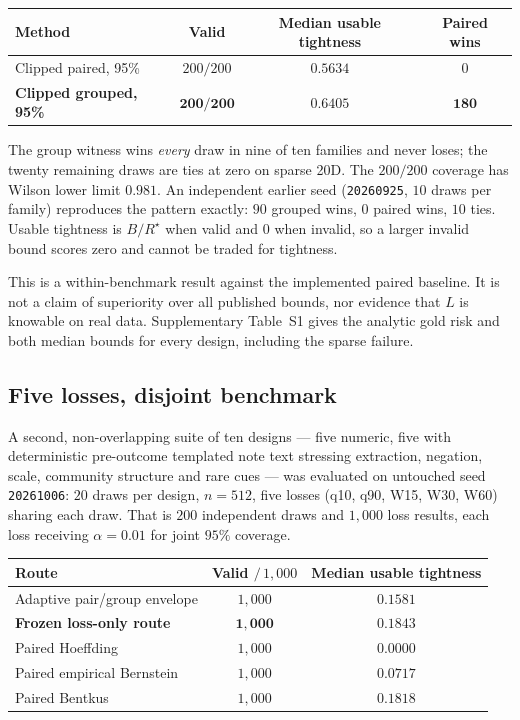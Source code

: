 \documentclass[11pt]{article}
\theoremstyle{definition}
\newcommand{\risk}{R^{\star}}
\begin{document}
\begin{center}
\begin{tabular}{lccc}
\toprule
Method & Valid & Median usable tightness & Paired wins \\
\midrule
Clipped paired, 95\% & $200/200$ & $0.5634$ & $0$ \\
\textbf{Clipped grouped, 95\%} & $\mathbf{200/200}$ & $\mathbf{0.6405}$ & $\mathbf{180}$ \\
\bottomrule
\end{tabular}
\end{center}

The group witness wins \emph{every} draw in nine of ten families and never loses; the twenty remaining draws are ties at zero on sparse 20D. The $200/200$ coverage has Wilson lower limit $0.981$. An independent earlier seed (\texttt{20260925}, $10$ draws per family) reproduces the pattern exactly: $90$ grouped wins, $0$ paired wins, $10$ ties. Usable tightness is $B/\risk$ when valid and $0$ when invalid, so a larger invalid bound scores zero and cannot be traded for tightness.

This is a within-benchmark result against the implemented paired baseline. It is not a claim of superiority over all published bounds, nor evidence that $L$ is knowable on real data.
Supplementary Table~S1 gives the analytic gold risk and both median bounds for every design, including the sparse failure.

\subsection{Five losses, disjoint benchmark}

A second, non-overlapping suite of ten designs --- five numeric, five with deterministic pre-outcome templated note text stressing extraction, negation, scale, community structure and rare cues --- was evaluated on untouched seed \texttt{20261006}: $20$ draws per design, $n=512$, five losses (q10, q90, W15, W30, W60) sharing each draw. That is $200$ independent draws and $1{,}000$ loss results, each loss receiving $\alpha=0.01$ for joint $95\%$ coverage.

\begin{center}
\begin{tabular}{lcc}
\toprule
Route & Valid $/\,1{,}000$ & Median usable tightness \\
\midrule
Adaptive pair/group envelope & $1{,}000$ & $0.1581$ \\
\textbf{Frozen loss-only route} & $\mathbf{1{,}000}$ & $\mathbf{0.1843}$ \\
Paired Hoeffding & $1{,}000$ & $0.0000$ \\
Paired empirical Bernstein & $1{,}000$ & $0.0717$ \\
Paired Bentkus & $1{,}000$ & $0.1818$ \\
\bottomrule
\end{tabular}
\end{center}
\end{document}
